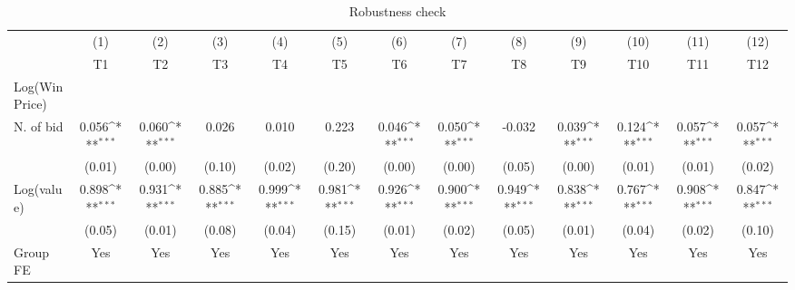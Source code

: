 {
\def\sym#1{\ifmmode^{#1}\else\(^{#1}\)\fi}
\begin{longtable}{l*{12}{c}}
\caption{Robustness check \label{reg2}}\\
\toprule\endfirsthead\midrule\endhead\midrule\endfoot\endlastfoot
                &\multicolumn{1}{c}{(1)}&\multicolumn{1}{c}{(2)}&\multicolumn{1}{c}{(3)}&\multicolumn{1}{c}{(4)}&\multicolumn{1}{c}{(5)}&\multicolumn{1}{c}{(6)}&\multicolumn{1}{c}{(7)}&\multicolumn{1}{c}{(8)}&\multicolumn{1}{c}{(9)}&\multicolumn{1}{c}{(10)}&\multicolumn{1}{c}{(11)}&\multicolumn{1}{c}{(12)}\\
                &\multicolumn{1}{c}{T1}&\multicolumn{1}{c}{T2}&\multicolumn{1}{c}{T3}&\multicolumn{1}{c}{T4}&\multicolumn{1}{c}{T5}&\multicolumn{1}{c}{T6}&\multicolumn{1}{c}{T7}&\multicolumn{1}{c}{T8}&\multicolumn{1}{c}{T9}&\multicolumn{1}{c}{T10}&\multicolumn{1}{c}{T11}&\multicolumn{1}{c}{T12}\\
Log(WinPrice)   &                  &                  &                  &                  &                  &                  &                  &                  &                  &                  &                  &                  \\
\midrule
N. of bid       &    0.056\sym{***}&    0.060\sym{***}&    0.026         &    0.010         &    0.223         &    0.046\sym{***}&    0.050\sym{***}&   -0.032         &    0.039\sym{***}&    0.124\sym{***}&    0.057\sym{***}&    0.057\sym{***}\\
                &   (0.01)         &   (0.00)         &   (0.10)         &   (0.02)         &   (0.20)         &   (0.00)         &   (0.00)         &   (0.05)         &   (0.00)         &   (0.01)         &   (0.01)         &   (0.02)         \\
Log(value)      &    0.898\sym{***}&    0.931\sym{***}&    0.885\sym{***}&    0.999\sym{***}&    0.981\sym{***}&    0.926\sym{***}&    0.900\sym{***}&    0.949\sym{***}&    0.838\sym{***}&    0.767\sym{***}&    0.908\sym{***}&    0.847\sym{***}\\
                &   (0.05)         &   (0.01)         &   (0.08)         &   (0.04)         &   (0.15)         &   (0.01)         &   (0.02)         &   (0.05)         &   (0.01)         &   (0.04)         &   (0.02)         &   (0.10)         \\
\midrule
Group FE        &      Yes         &      Yes         &      Yes         &      Yes         &      Yes         &      Yes         &      Yes         &      Yes         &      Yes         &      Yes         &      Yes         &      Yes         \\

\end{longtable}}
